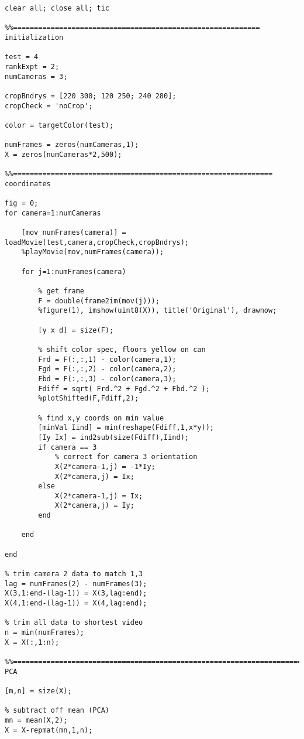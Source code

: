 \begin{verbatim}
clear all; close all; tic

%%===========================================================     initialization

test = 4
rankExpt = 2;
numCameras = 3;

cropBndrys = [220 300; 120 250; 240 280];
cropCheck = 'noCrop';

color = targetColor(test);

numFrames = zeros(numCameras,1);
X = zeros(numCameras*2,500);

%%==============================================================     coordinates

fig = 0;
for camera=1:numCameras
	
    [mov numFrames(camera)] = loadMovie(test,camera,cropCheck,cropBndrys);
    %playMovie(mov,numFrames(camera));
	
    for j=1:numFrames(camera)

        % get frame
        F = double(frame2im(mov(j)));
        %figure(1), imshow(uint8(X)), title('Original'), drawnow;

        [y x d] = size(F);

        % shift color spec, floors yellow on can
        Frd = F(:,:,1) - color(camera,1);
        Fgd = F(:,:,2) - color(camera,2);
        Fbd = F(:,:,3) - color(camera,3);
        Fdiff = sqrt( Frd.^2 + Fgd.^2 + Fbd.^2 );
        %plotShifted(F,Fdiff,2);

        % find x,y coords on min value
        [minVal Iind] = min(reshape(Fdiff,1,x*y));
        [Iy Ix] = ind2sub(size(Fdiff),Iind);
        if camera == 3
            % correct for camera 3 orientation
            X(2*camera-1,j) = -1*Iy;
            X(2*camera,j) = Ix;
        else
            X(2*camera-1,j) = Ix;
            X(2*camera,j) = Iy;
        end

    end
	
end

% trim camera 2 data to match 1,3
lag = numFrames(2) - numFrames(3);
X(3,1:end-(lag-1)) = X(3,lag:end);
X(4,1:end-(lag-1)) = X(4,lag:end);

% trim all data to shortest video
n = min(numFrames);
X = X(:,1:n);

%%======================================================================     PCA

[m,n] = size(X);

% subtract off mean (PCA)
mn = mean(X,2);
X = X-repmat(mn,1,n);


\end{verbatim}
